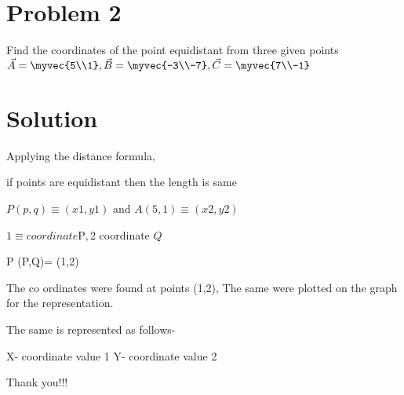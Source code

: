 \documentclass[journal,12pt,twocolumn]{IEEEtran}
\begin{document}
\section{Problem 2}
Find the coordinates of the point equidistant from three given points$\vec {A}=\myvec {5\\1},
\vec {B}=\myvec {-3\\-7},
\vec {C}=\myvec {7\\-1}$

\section{Solution}

Applying the distance formula,

if points are equidistant then the length is same
    
$P(p,q)$$ \equiv$$ (x1,y1)$ 
and $A(5,1)$$ \equiv$$ (x2,y2)$

$1 \equiv  coordinate $P$,
$2 \equiv coordinate $Q$

\theequation P (P,Q)= (1,2)

  



The co ordinates were found at points (1,2), The same were plotted on the graph for the representation.

The same is represented as follows-

X- coordinate value 1
Y- coordinate value 2



Thank you!!!
\end{document}
